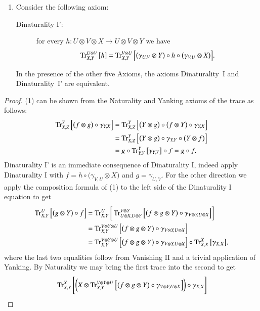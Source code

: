 \documentclass[12pt,oneside,article,draft]{memoir}
\begin{document}
{\begin{proposition}
\begin{enumerate}
 \[g\circ f=\Tr^Y_{X,Z}\Big[\big(f\otimes g\big)\circ\gamma_{Y,X}\Big].\]
 \item Consider the following axiom:
 \begin{description}
  \item [Dinaturality I':] for every $h\colon U\otimes V\otimes X\to U\otimes V\otimes Y$ we have
 \[\operatorname{Tr}^{U\otimes V}_{X,Y}\big[h\big]=\operatorname{Tr}^{V\otimes U}_{X,Y}\Big[\big(\gamma_{U,V}\otimes Y\big)\circ h\circ\big(\gamma_{V,U}\otimes X\big)\Big].\]
 \end{description}
 In the presence of the other five Axioms, the axioms Dinaturality~I and Dinaturality~I' are equivalent.
\end{enumerate}
\end{proposition}
\begin{proof}
 (1) can be shown from the Naturality and Yanking axioms of the trace as follows:
 \begin{align*}
  \operatorname{Tr}^Y_{X,Z}\Big[\big(f\otimes g\big)\circ\gamma_{Y,X}\Big]
  &=\operatorname{Tr}^Y_{X,Z}\Big[\big(Y\otimes g\big)\circ\big(f\otimes Y\big)\circ\gamma_{Y,X}\Big]\\
  &=\operatorname{Tr}^Y_{X,Z}\Big[\big(Y\otimes g\big)\circ\gamma_{Y,Y}\circ\big(Y\otimes f\big)\Big]\\
  &=g\circ\operatorname{Tr}^Y_{Y,Y}\big[\gamma_{Y,Y}\big]\circ f=g\circ f.
 \end{align*}
 Dinaturality I' is an immediate consequence of Dinaturality I, indeed apply Dinaturality I with $f=h\circ\big(\gamma_{V,U}\otimes X\big)$ and $g=\gamma_{U,V}$.
 For the other direction we apply the composition formula of (1) to the left side of the Dinaturality I equation to get
 \begin{align*}
  \operatorname{Tr}^U_{X,Y}\Big[\big(g\otimes Y\big)\circ f\Big]
  &=\operatorname{Tr}^U_{X,Y}\bigg[\operatorname{Tr}^{V\otimes Y}_{U\otimes X,U\otimes Y}\Big[\big(f\otimes g\otimes Y\big)\circ\gamma_{V\otimes Y,U\otimes X}\Big]\bigg]\\
 &=\operatorname{Tr}^{V\otimes Y\otimes U}_{X,Y}\Big[\big(f\otimes g\otimes Y\big)\circ\gamma_{V\otimes Y,U\otimes X}\Big]\\
  &=\operatorname{Tr}^{V\otimes Y\otimes U}_{X,Y}\Big[\big(f\otimes g\otimes Y\big)\circ\gamma_{V\otimes Y,U\otimes X}\Big]\circ\operatorname{Tr}^X_{X,X}\big[\gamma_{X,X}\big],
 \end{align*}
 where the last two equalities follow from Vanishing II and a trivial application of Yanking.  
 By Naturality we may bring the first trace into the second to get
 \begin{align*}
  &\Tr^X_{X,Y}\Bigg[\bigg(X\otimes \Tr^{V\otimes Y\otimes U}_{X,Y}\Big[\big(f\otimes g\otimes Y\big)\circ\gamma_{V\otimes Y,U\otimes X}\Big]\bigg)\circ\gamma_{X,X}\Bigg]\\

\end{align*}
\end{proof}}
\end{document}

